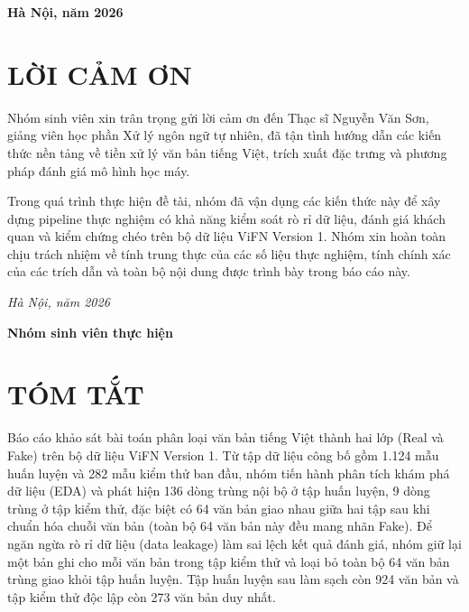 \documentclass[12pt,a4paper]{report}
\begin{document}
\begin{titlepage}
\begin{center}
  \vspace{1.2cm}
  \begin{flushleft}
  \end{flushleft}

  \vfill
  {\fontsize{13pt}{15pt}\selectfont \textbf{Hà Nội, năm 2026}\par}
\end{center}
\end{titlepage}

\setcounter{page}{1}

\chapter*{LỜI CẢM ƠN}
Nhóm sinh viên xin trân trọng gửi lời cảm ơn đến Thạc sĩ Nguyễn Văn Sơn, giảng viên học phần Xử lý ngôn ngữ tự nhiên, đã tận tình hướng dẫn các kiến thức nền tảng về tiền xử lý văn bản tiếng Việt, trích xuất đặc trưng và phương pháp đánh giá mô hình học máy. 

Trong quá trình thực hiện đề tài, nhóm đã vận dụng các kiến thức này để xây dựng pipeline thực nghiệm có khả năng kiểm soát rò rỉ dữ liệu, đánh giá khách quan và kiểm chứng chéo trên bộ dữ liệu ViFN Version 1. Nhóm xin hoàn toàn chịu trách nhiệm về tính trung thực của các số liệu thực nghiệm, tính chính xác của các trích dẫn và toàn bộ nội dung được trình bày trong báo cáo này.

\vspace{1cm}
\begin{flushright}
  \textit{Hà Nội, năm 2026}\par
  \textbf{Nhóm sinh viên thực hiện}
\end{flushright}

\clearpage

\chapter*{TÓM TẮT}
Báo cáo khảo sát bài toán phân loại văn bản tiếng Việt thành hai lớp (Real và Fake) trên bộ dữ liệu ViFN Version 1. Từ tập dữ liệu công bố gồm 1.124 mẫu huấn luyện và 282 mẫu kiểm thử ban đầu, nhóm tiến hành phân tích khám phá dữ liệu (EDA) và phát hiện 136 dòng trùng nội bộ ở tập huấn luyện, 9 dòng trùng ở tập kiểm thử, đặc biệt có 64 văn bản giao nhau giữa hai tập sau khi chuẩn hóa chuỗi văn bản (toàn bộ 64 văn bản này đều mang nhãn Fake). Để ngăn ngừa rò rỉ dữ liệu (data leakage) làm sai lệch kết quả đánh giá, nhóm giữ lại một bản ghi cho mỗi văn bản trong tập kiểm thử và loại bỏ toàn bộ 64 văn bản trùng giao khỏi tập huấn luyện. Tập huấn luyện sau làm sạch còn 924 văn bản và tập kiểm thử độc lập còn 273 văn bản duy nhất.
\end{document}
